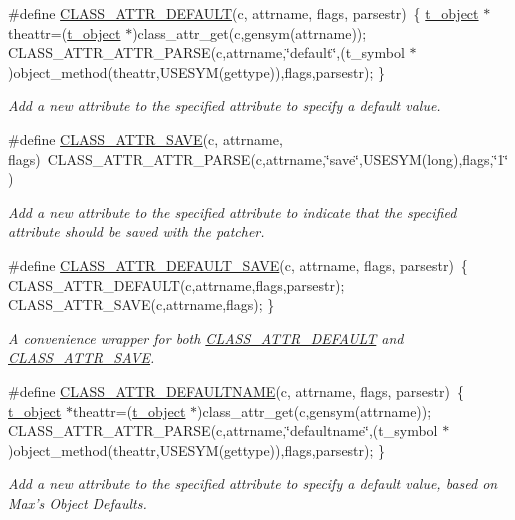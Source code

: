 \begin{DoxyCompactItemize}
\#define \hyperlink{group__attr_ga91196b43f49d6769e6fe2df99f5c7c77}{CLASS\_\-ATTR\_\-DEFAULT}(c, attrname, flags, parsestr)~\{ \hyperlink{structt__object}{t\_\-object} $\ast$theattr=(\hyperlink{structt__object}{t\_\-object} $\ast$)class\_\-attr\_\-get(c,gensym(attrname)); CLASS\_\-ATTR\_\-ATTR\_\-PARSE(c,attrname,\char`\"{}default\char`\"{},(t\_\-symbol $\ast$)object\_\-method(theattr,USESYM(gettype)),flags,parsestr); \}
\begin{DoxyCompactList}\small\item\em Add a new attribute to the specified attribute to specify a default value. \item\end{DoxyCompactList}\item 
\#define \hyperlink{group__attr_gaf56dc31d0defad3cdc1ee60b611acc79}{CLASS\_\-ATTR\_\-SAVE}(c, attrname, flags)~CLASS\_\-ATTR\_\-ATTR\_\-PARSE(c,attrname,\char`\"{}save\char`\"{},USESYM(long),flags,\char`\"{}1\char`\"{})
\begin{DoxyCompactList}\small\item\em Add a new attribute to the specified attribute to indicate that the specified attribute should be saved with the patcher. \item\end{DoxyCompactList}\item 
\#define \hyperlink{group__attr_gae34187cee29d0508d00c725ba33c091a}{CLASS\_\-ATTR\_\-DEFAULT\_\-SAVE}(c, attrname, flags, parsestr)~\{ CLASS\_\-ATTR\_\-DEFAULT(c,attrname,flags,parsestr); CLASS\_\-ATTR\_\-SAVE(c,attrname,flags); \}
\begin{DoxyCompactList}\small\item\em A convenience wrapper for both \hyperlink{group__attr_ga91196b43f49d6769e6fe2df99f5c7c77}{CLASS\_\-ATTR\_\-DEFAULT} and \hyperlink{group__attr_gaf56dc31d0defad3cdc1ee60b611acc79}{CLASS\_\-ATTR\_\-SAVE}. \item\end{DoxyCompactList}\item 
\#define \hyperlink{group__attr_gaf6ee00a905a84d18172a212667cfa4cb}{CLASS\_\-ATTR\_\-DEFAULTNAME}(c, attrname, flags, parsestr)~\{ \hyperlink{structt__object}{t\_\-object} $\ast$theattr=(\hyperlink{structt__object}{t\_\-object} $\ast$)class\_\-attr\_\-get(c,gensym(attrname)); CLASS\_\-ATTR\_\-ATTR\_\-PARSE(c,attrname,\char`\"{}defaultname\char`\"{},(t\_\-symbol $\ast$)object\_\-method(theattr,USESYM(gettype)),flags,parsestr); \}
\begin{DoxyCompactList}\small\item\em Add a new attribute to the specified attribute to specify a default value, based on Max's Object Defaults. \item\end{DoxyCompactList}\item 

\end{DoxyCompactItemize}
